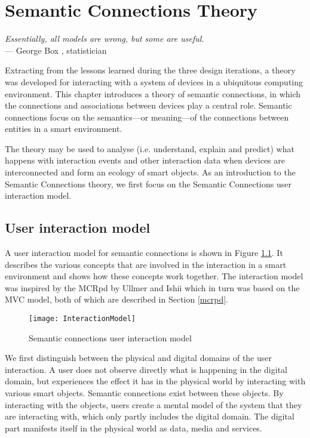 \chapter{Semantic Connections Theory}
\label{SemanticConnectionsTheory}

\begin{flushright}{\slshape    
Essentially, all models are wrong, but some are useful.} \\ \medskip
    --- George Box \cite{Box1987}, statistician
\end{flushright}




Extracting from the lessons learned during the three design iterations, a theory was developed for interacting with a system of devices in a ubiquitous computing environment. This chapter introduces a theory of semantic connections, in which the connections and associations between devices play a central role. Semantic connections focus on the semantics---or meaning---of the connections between entities in a smart environment. 

The theory may be used to analyse (i.e. understand, explain and predict) what happens with interaction events and other interaction data when devices are interconnected and form an ecology of smart objects. As an introduction to the Semantic Connections theory, we first focus on the Semantic Connections user interaction model.

\section{User interaction model}
\label{InteractionModel}

A user interaction model for semantic connections is shown in Figure \ref{model}. It describes the various concepts that are involved in the interaction in a smart environment and shows how these concepts work together. The interaction model was inspired by the \ac{MCRpd} by Ullmer and Ishii \cite{Ullmer2000} which in turn was based on the \ac{MVC} model, both of which are described in Section \ref{mcrpd}. 

\begin{figure}
\texttt{[image: InteractionModel]}
\caption{Semantic connections user interaction model}
\label{model}
\end{figure}

We first distinguish between the physical and digital domains of the user interaction. A user does not observe directly what is happening in the digital domain, but experiences the effect it has in the physical world by interacting with various smart objects. Semantic connections exist between these objects. By interacting with the objects, users create a mental model of the system that they are interacting with, which only partly includes the digital domain. The digital part manifests itself in the physical world as data, media and services. 


